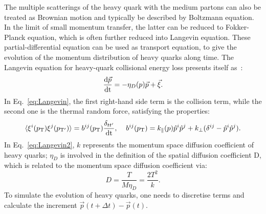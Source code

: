 The multiple scatterings of the heavy quark with the medium partons can also be treated as Brownian motion and typically
be described by Boltzmann equation. In the limit of small momentum transfer, the latter can be reduced to 
Fokker-Planck equation, which is often further reduced into Langevin equation. These
partial-differential equation can be used as transport equation, to give the evolution of the momentum distribution
of heavy quarks along time. The Langevin equation for heavy-quark collisional energy loss presents itself as~\cite{Cao:2013ita}:
\begin{equation}
\label{eq:Langevin}
\frac{{\rm d} {\vec{p}}}{\rm d t} = - \eta_D (p) \vec{p} + \vec{\xi}.
\end{equation}
In Eq.~\ref{eq:Langevin}, the first right-hand side term is the collision term, while the second one is the thermal random force,
satisfying the properties:
\begin{equation}
\label{eq:Langevin2}
\langle {\xi^i (p_{\rm T})} {\xi^j (p_{\rm T'})} \rangle = b^{ij} (p_{\rm T}) \frac{\delta_{tt'}}{\rm d t}, \; \; \; \; b^{ij} (p_{\rm T}) = k_{\parallel}(p)\hat{p}^i\hat{p}^j + k_{\perp} (\delta^{ij} - \hat{p}^i\hat{p}^j).
\end{equation}
In Eq.~\ref{eq:Langevin2}, $k$ represents the momentum space diffusion coefficient of heavy quarks;
$\eta_D$ is involved in the definition of the spatial diffusion coefficient D, which is related to the momentum space 
diffusion coefficient via: 
\begin{equation}
\label{eq:Langevin3}
D = \frac{T}{M \eta_D} = \frac{2 T^2}{k}.
\end{equation}
To simulate the evolution of heavy quarks, one needs to discretise terms and calculate the increment 
$\vec{p}(t + \Delta t) -  \vec{p}(t)$. 

